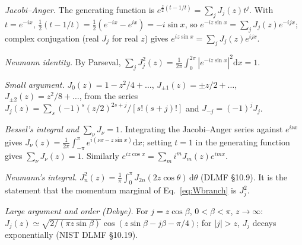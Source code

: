 \documentclass[aps,pra,onecolumn,notitlepage,nofootinbib,11pt]{revtex4-2}
\newcommand{\dd}{\mathrm{d}}
\begin{document}
\emph{Jacobi--Anger.} The generating function is
$e^{\frac{z}{2}(t-1/t)}=\sum_{j}J_{j}(z)t^{j}$. With $t=e^{-ix}$,
$\frac12(t-1/t)=\frac12(e^{-ix}-e^{ix})=-i\sin x$, so
$e^{-iz\sin x}=\sum_{j}J_{j}(z)e^{-ijx}$; complex conjugation (real $J_{j}$ for real $z$)
gives $e^{iz\sin x}=\sum_{j}J_{j}(z)e^{ijx}$.

\emph{Neumann identity.} By Parseval,
$\sum_{j}J_{j}^{2}(z)=\frac{1}{2\pi}\int_{0}^{2\pi}|e^{-iz\sin x}|^{2}\dd x=1$.

\emph{Small argument.} $J_{0}(z)=1-z^{2}/4+\dots$, $J_{\pm1}(z)=\pm z/2+\dots$,
$J_{\pm2}(z)=z^{2}/8+\dots$, from the series $J_{j}(z)=\sum_{s}(-1)^{s}(z/2)^{2s+j}/[s!(s+j)!]$
and $J_{-j}=(-1)^{j}J_{j}$.

\emph{Bessel's integral and $\sum_{\nu}J_{\nu}=1$.} Integrating the Jacobi--Anger series
against $e^{i\nu x}$ gives $J_{\nu}(z)=\frac{1}{2\pi}\int_{-\pi}^{\pi}e^{i(\nu x-z\sin x)}\dd x$;
setting $t=1$ in the generating function gives $\sum_{\nu}J_{\nu}(z)=1$. Similarly
$e^{iz\cos x}=\sum_{m}i^{m}J_{m}(z)e^{imx}$.

\emph{Neumann's integral.} $J_{n}^{2}(z)=\frac{1}{\pi}\int_{0}^{\pi}J_{2n}(2z\cos\theta)\,\dd\theta$
(DLMF \S10.9). It is the statement that the momentum marginal of Eq.~\eqref{eq:Wbranch} is
$J_{j}^{2}$.

\emph{Large argument and order (Debye).} For $j=z\cos\beta$, $0<\beta<\pi$, $z\to\infty$:
$J_{j}(z)\simeq\sqrt{2/(\pi z\sin\beta)}\cos(z\sin\beta-j\beta-\pi/4)$; for $|j|>z$, $J_{j}$
decays exponentially (NIST DLMF \S10.19).
\end{document}
